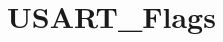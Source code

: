 \hypertarget{group___u_s_a_r_t___flags}{\section{U\-S\-A\-R\-T\-\_\-\-Flags}
\label{group___u_s_a_r_t___flags}
}

